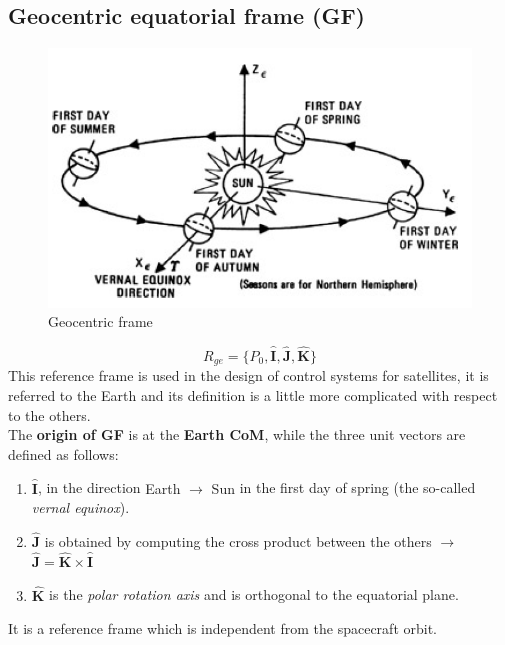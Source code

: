 \subsection{\textsf{\textbf{Geocentric equatorial frame (GF)}}}
\begin{figure}[h]
    \centering
    \includegraphics[scale=0.7]{AerospaceApplications/images/GF.png}
    \caption{Geocentric frame}
\end{figure}
\vspace{-0.8em}
{\Large\color{blue}
\begin{equation}
    R_{ge} = \{
        P_0, \mathbf{\hat{I}, \hat{J}, \hat{K}}
    \}
\end{equation}
}
This reference frame is used in the design of control systems for satellites, it is referred to the Earth and its definition is a little more complicated with respect to the others.\\
The \textbf{origin of GF} is at the \textbf{Earth CoM}, while the three unit vectors are defined as follows:
\begin{enumerate}
    \item $\mathbf{\hat{I}}$, in the direction \textsf{Earth $\to$ Sun} in the first day of spring (the so-called \textit{vernal equinox}).
    \item $\mathbf{\hat{J}}$ is obtained by computing the cross product between the others $\to$ $\mathbf{\hat{J} = \hat{K} \times \hat{I}}$
    \item $\mathbf{\hat{K}}$ is the \textit{polar rotation axis} and is orthogonal to the equatorial plane.
\end{enumerate}
It is a reference frame which is independent from the spacecraft orbit.

